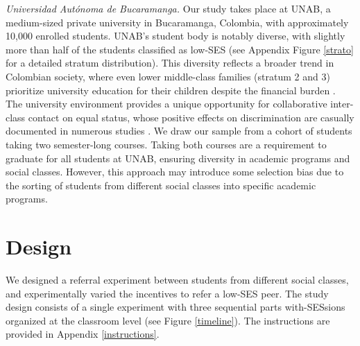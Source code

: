 \documentclass[11pt,a4paper,oneside]{article}
\begin{document}
\textit{Universidad Autónoma de Bucaramanga.}  Our study takes place at UNAB, a medium-sized private university in Bucaramanga, Colombia, with approximately 10,000 enrolled students. UNAB's student body is notably diverse, with slightly more than half of the students classified as low-SES (see Appendix Figure \ref{strato} for a detailed stratum distribution). This diversity reflects a broader trend in Colombian society, where even lower middle-class families (stratum 2 and 3) prioritize university education for their children despite the financial burden \citep[p. 103]{hudson_colombia_2010}. The university environment provides a unique opportunity for collaborative inter-class contact on equal status, whose positive effects on discrimination are casually documented in numerous studies \citep{rao2019familiarity, mousa2020building,lowe2021types}. We draw our sample from a cohort of students taking two semester-long courses. Taking both courses are a requirement to graduate for all students at UNAB, ensuring diversity in academic programs and social classes. However, this approach may introduce some selection bias due to the sorting of students from different social classes into specific academic programs.



\section{Design}
We designed a referral experiment between students from different social classes, and experimentally varied the incentives to refer a low-SES peer. The study design consists of a single experiment with three sequential parts with-SESsions organized at the classroom level (see Figure \ref{timeline}). The instructions are provided in Appendix \ref{instructions}. 
\end{document}
